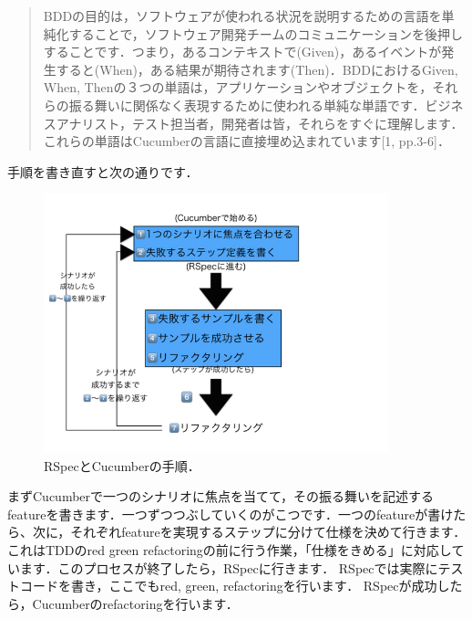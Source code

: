 \begin{quotation}
BDDの目的は，ソフトウェアが使われる状況を説明するための言語を単純化することで，ソフトウェア開発チームのコミュニケーションを後押しすることです．つまり，あるコンテキストで(Given)，あるイベントが発生すると(When)，ある結果が期待されます(Then)．BDDにおけるGiven, When, Thenの３つの単語は，アプリケーションやオブジェクトを，それらの振る舞いに関係なく表現するために使われる単純な単語です．ビジネスアナリスト，テスト担当者，開発者は皆，それらをすぐに理解します．これらの単語はCucumberの言語に直接埋め込まれています[1, pp.3-6]．

\end{quotation}
手順を書き直すと次の通りです．

\begin{figure}[htbp]\begin{center}
\includegraphics[width=10cm,bb= 0 0 737 553]{../figs/./my_help_nasu1.001.jpg}
\caption{RSpecとCucumberの手順．}
\label{default}\end{center}\end{figure}
まずCucumberで一つのシナリオに焦点を当てて，その振る舞いを記述するfeatureを書きます．一つずつつぶしていくのがこつです．一つのfeatureが書けたら、次に，それぞれfeatureを実現するステップに分けて仕様を決めて行きます．これはTDDのred green refactoringの前に行う作業，「仕様をきめる」に対応しています．このプロセスが終了したら，RSpecに行きます．
RSpecでは実際にテストコードを書き，ここでもred, green, refactoringを行います．
RSpecが成功したら，Cucumberのrefactoringを行います．

